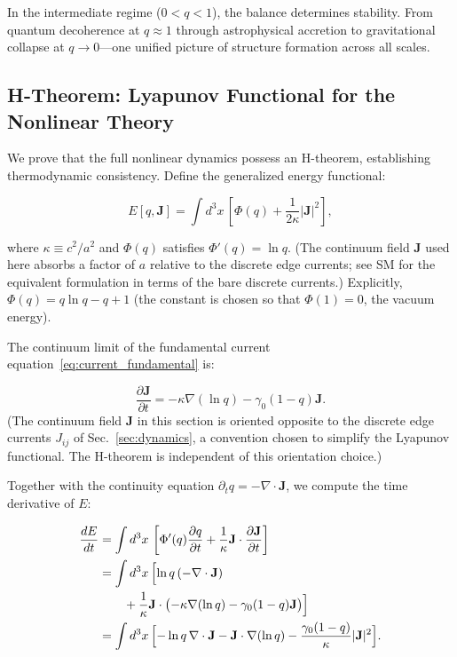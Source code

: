 \documentclass[aps,prd,twocolumn,showpacs,superscriptaddress,preprintnumbers]{revtex4-2}
\begin{document}
In the intermediate regime ($0<q<1$), the balance determines stability.
From quantum decoherence at $q\approx1$ through astrophysical accretion to gravitational collapse at $q\to0$---one unified picture of structure formation across all scales.

\subsection{H-Theorem: Lyapunov Functional for the Nonlinear Theory}

\label{sec:lyapunov}

We prove that the full nonlinear dynamics possess an H-theorem, establishing thermodynamic consistency.
Define the generalized energy functional:

\begin{equation}
E[q,\mathbf{J}] = \int d^3x\,\left[\Phi(q) + \frac{1}{2\kappa}|\mathbf{J}|^2\right],
\label{eq:lyapunov_E}
\end{equation}

where $\kappa\equiv c^2/a^2$ and $\Phi(q)$ satisfies $\Phi'(q)=\ln q$. (The continuum field $\mathbf{J}$ used here absorbs a factor of $a$ relative to the discrete edge currents; see SM for the equivalent formulation in terms of the bare discrete currents.)
Explicitly, $\Phi(q)=q\ln q - q + 1$ (the constant is chosen so that $\Phi(1)=0$, the vacuum energy).

The continuum limit of the fundamental current equation~\eqref{eq:current_fundamental} is:

\begin{equation}
\frac{\partial \mathbf{J}}{\partial t} = -\kappa\nabla(\ln q) - \gamma_0(1-q)\mathbf{J}.
\label{eq:J_continuum}
\end{equation}
(The continuum field $\mathbf{J}$ in this section is oriented opposite to the discrete edge currents $J_{ij}$ of Sec.~\ref{sec:dynamics}, a convention chosen to simplify the Lyapunov functional. The H-theorem is independent of this orientation choice.)

Together with the continuity equation $\partial_t q = -\nabla\cdot\mathbf{J}$, we compute the time derivative of $E$:

\begin{align}
\frac{dE}{dt} &= \int d^3x\,\left[\Phi'(q)\frac{\partial q}{\partial t} + \frac{1}{\kappa}\mathbf{J}\cdot\frac{\partial\mathbf{J}}{\partial t}\right] \nonumber \\
&= \int d^3x\,\Bigl[\ln q\,(-\nabla\cdot\mathbf{J}) \nonumber \\
&\qquad + \frac{1}{\kappa}\mathbf{J}\cdot\bigl(-\kappa\nabla(\ln q) - \gamma_0(1-q)\mathbf{J}\bigr)\Bigr] \nonumber \\
&= \int d^3x\,\Bigl[-\ln q\,\nabla\cdot\mathbf{J} - \mathbf{J}\cdot\nabla(\ln q) - \frac{\gamma_0(1-q)}{\kappa}|\mathbf{J}|^2\Bigr].
\label{eq:dEdt_step1}
\end{align}
\end{document}
